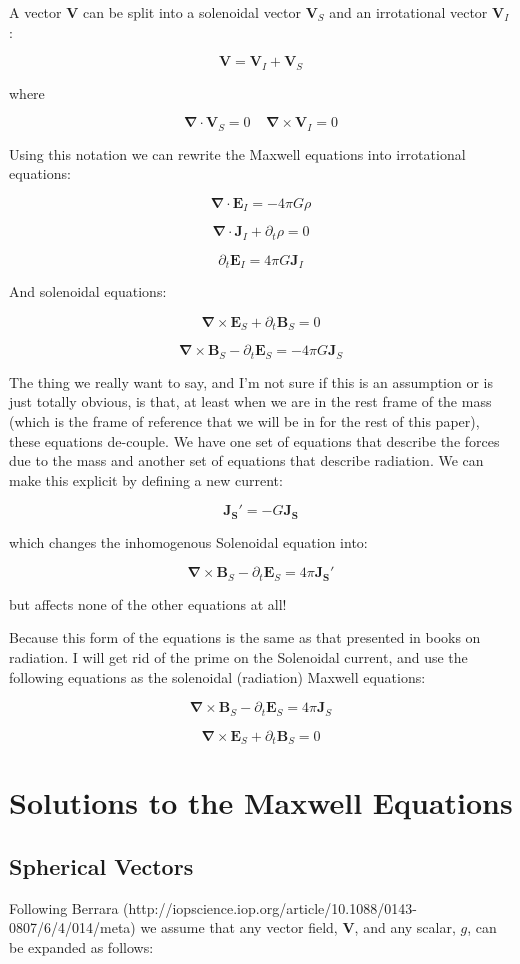 \documentclass {article}
\renewcommand\vec{\mathbf}
\let\OldS\nabla
\renewcommand{\nabla}{\boldsymbol{\OldS}}
\begin{document}
A vector $\vec V$ can be split into a solenoidal vector $\vec V_S$ and an irrotational vector $\vec V_I$:

$$\vec V = \vec V_I + \vec V_S $$

where

$$\nabla \cdot \vec V_S = 0 ~~~~~ \nabla \times \vec V_I = 0 $$

Using this notation we can rewrite the Maxwell equations into irrotational equations:

$$\nabla \cdot \vec E_I = -4 \pi G  \rho$$

$$\nabla \cdot \vec J_I + \partial_t \rho = 0 $$

$$ \partial_t \vec E_I = 4 \pi G \vec J_I $$

And solenoidal equations:

$$\nabla \times \vec E_S + \partial_t \vec B_S = 0 $$

$$\nabla \times \vec B_S - \partial_t \vec E_S =  - 4 \pi G \vec J_S$$

The thing we really want to say, and I'm not sure if this is an assumption or is just totally obvious, is that, at least when we are in the rest frame of the mass (which is the frame of reference that we will be in for the rest of this paper), these equations de-couple. We have one set of equations that describe the forces due to the mass and another set of equations that describe radiation. We can make this explicit by defining a new current:

$$\vec {J_S'} = - G \vec {J_S}$$

which changes the inhomogenous Solenoidal equation into:

$$\nabla \times \vec B_S - \partial_t \vec E_S =  4 \pi \vec {J_S'} $$

but affects none of the other equations at all!

Because this form of the equations is the same as that presented in books on radiation. I will get rid of the prime on the Solenoidal current, and use the following equations as the solenoidal (radiation) Maxwell equations:

$$\nabla \times \vec B_S - \partial_t \vec E_S =  4 \pi \vec J_S$$

$$\nabla \times \vec E_S + \partial_t \vec B_S = 0 $$
\newpage

\section{Solutions to the Maxwell Equations}
\subsection{Spherical Vectors}
Following Berrara (http://iopscience.iop.org/article/10.1088/0143-0807/6/4/014/meta) we assume that any vector field, $\vec V$, and any scalar, $g$, can be expanded as follows:
\end{document}
